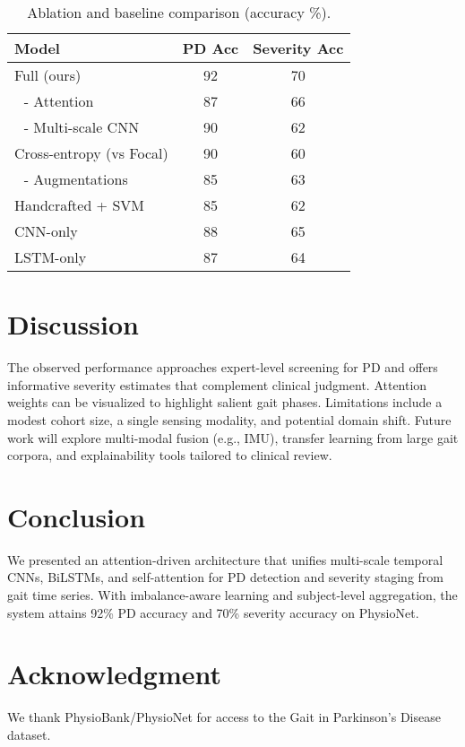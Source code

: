 \documentclass[conference]{IEEEtran}
\begin{document}
\begin{table*}[t]
\centering
\caption{Ablation and baseline comparison (accuracy \%).}
\label{tab:user_ablation}
\begin{tabular}{lcc}
\toprule
Model & PD Acc & Severity Acc \\
\midrule
Full (ours)              & 92 & 70 \\
\,\, - Attention         & 87 & 66 \\
\,\, - Multi-scale CNN    & 90 & 62 \\
Cross-entropy (vs Focal) & 90 & 60 \\
\,\, - Augmentations      & 85 & 63 \\
Handcrafted + SVM        & 85 & 62 \\
CNN-only                 & 88 & 65 \\
LSTM-only                & 87 & 64 \\
\bottomrule
\end{tabular}
\end{table*}

\section{Discussion}
The observed performance approaches expert-level screening for PD and offers informative severity estimates that complement clinical judgment. Attention weights can be visualized to highlight salient gait phases. Limitations include a modest cohort size, a single sensing modality, and potential domain shift. Future work will explore multi-modal fusion (e.g., IMU), transfer learning from large gait corpora, and explainability tools tailored to clinical review.

\section{Conclusion}
We presented an attention-driven architecture that unifies multi-scale temporal CNNs, BiLSTMs, and self-attention for PD detection and severity staging from gait time series. With imbalance-aware learning and subject-level aggregation, the system attains 92\% PD accuracy and 70\% severity accuracy on PhysioNet.

\section*{Acknowledgment}
We thank PhysioBank/PhysioNet for access to the Gait in Parkinson's Disease dataset.
\end{document}
